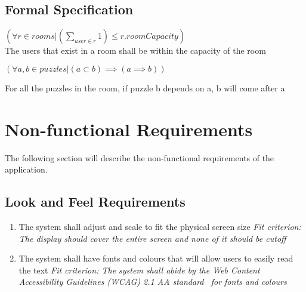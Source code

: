\documentclass[12pt]{article}
\begin{document}
\subsection{Formal Specification}
$(\forall r \in rooms  | (\sum\limits_{user \in r} 1)  \leq r.roomCapacity)$\\

The users that exist in a room shall be within the capacity of the room

$ (\forall a,b \in puzzles  |  (a \subset b) \implies (a \implies b))$
 
For all the puzzles in the room, if puzzle b depends on a, b will come after a


\section{Non-functional Requirements}
The following section will describe the non-functional requirements of the application.
\subsection{Look and Feel Requirements}
\begin{enumerate}[LF\arabic*.]
	\item The system shall adjust and scale to fit the physical screen size\newline
    \textit{Fit criterion: The display should cover the entire screen and none of it should be cutoff}
	\item The system shall have fonts and colours that will allow users to easily read the text\newline
    \textit{Fit criterion: The system shall abide by the Web Content Accessibility Guidelines (WCAG) 2.1 AA standard~\citep{WCAG2.1}  for fonts and colours}
\end{enumerate}
\end{document}
